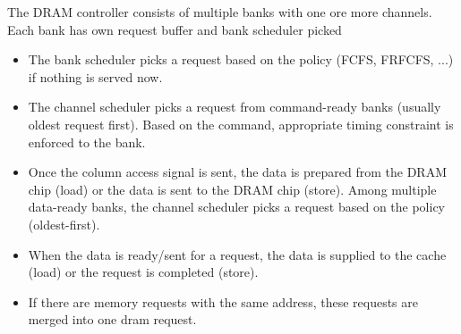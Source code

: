The DRAM controller consists of multiple banks with one ore more
channels. Each bank has own request buffer and bank scheduler picked

\begin{itemize}
  \item The bank scheduler picks a request based on the policy (FCFS,
  FRFCFS, ...) if nothing is served now.

  \item The channel scheduler picks a request from command-ready banks
  (usually oldest request first). Based on the command, appropriate
  timing constraint is enforced to the bank.

  \item Once the column access signal is sent, the data is prepared
  from the DRAM chip (load) or the data is sent to the DRAM chip
  (store). Among multiple data-ready banks, the channel scheduler
  picks a request based on the policy (oldest-first).

  \item When the data is ready/sent for a request, the data is
  supplied to the cache (load) or the request is completed (store).

  \item If there are memory requests with the same address, these
  requests are merged into one dram request. 

\end{itemize}



